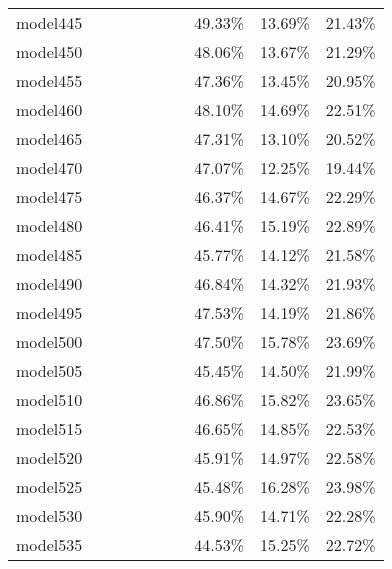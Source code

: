 \begin{longtable}{@{}llllllllll@{}}
model445 &         &         &         &          &         &         & 49.33\%  & 13.69\% & 21.43\% \\
model450 &         &         &         &          &         &         & 48.06\%  & 13.67\% & 21.29\% \\
model455 &         &         &         &          &         &         & 47.36\%  & 13.45\% & 20.95\% \\
model460 &         &         &         &          &         &         & 48.10\%  & 14.69\% & 22.51\% \\
model465 &         &         &         &          &         &         & 47.31\%  & 13.10\% & 20.52\% \\
model470 &         &         &         &          &         &         & 47.07\%  & 12.25\% & 19.44\% \\
model475 &         &         &         &          &         &         & 46.37\%  & 14.67\% & 22.29\% \\
model480 &         &         &         &          &         &         & 46.41\%  & 15.19\% & 22.89\% \\
model485 &         &         &         &          &         &         & 45.77\%  & 14.12\% & 21.58\% \\
model490 &         &         &         &          &         &         & 46.84\%  & 14.32\% & 21.93\% \\
model495 &         &         &         &          &         &         & 47.53\%  & 14.19\% & 21.86\% \\
model500 &         &         &         &          &         &         & 47.50\%  & 15.78\% & 23.69\% \\
model505 &         &         &         &          &         &         & 45.45\%  & 14.50\% & 21.99\% \\
model510 &         &         &         &          &         &         & 46.86\%  & 15.82\% & 23.65\% \\
model515 &         &         &         &          &         &         & 46.65\%  & 14.85\% & 22.53\% \\
model520 &         &         &         &          &         &         & 45.91\%  & 14.97\% & 22.58\% \\
model525 &         &         &         &          &         &         & 45.48\%  & 16.28\% & 23.98\% \\
model530 &         &         &         &          &         &         & 45.90\%  & 14.71\% & 22.28\% \\
model535 &         &         &         &          &         &         & 44.53\%  & 15.25\% & 22.72\% \\

\end{longtable}
